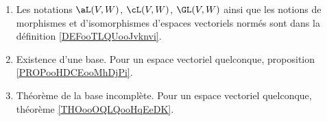 

\begin{enumerate}
    \item
        Les notations \( \aL(V,W)\), \( \cL(V,W)\), \( \GL(V,W)\) ainsi que les notions de morphismes et d'isomorphismes d'espaces vectoriels normés sont dans la définition \ref{DEFooTLQUooJvknvi}.
	\item
	      Existence d'une base. Pour un espace vectoriel quelconque, proposition \ref{PROPooHDCEooMhDjPi}.
	\item
	      Théorème de la base incomplète. Pour un espace vectoriel quelconque, théorème \ref{THOooOQLQooHqEeDK}.
\end{enumerate}

